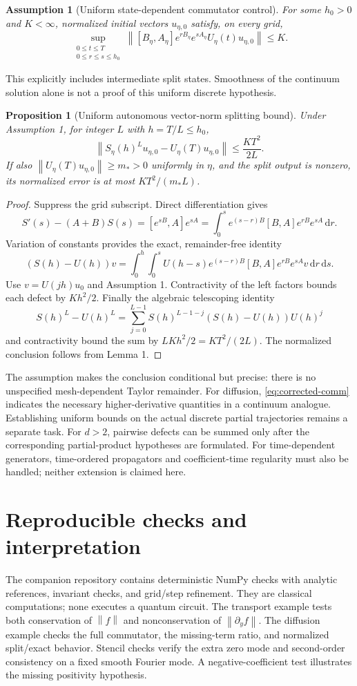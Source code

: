 \documentclass[11pt]{article}
\newtheorem{proposition}{Proposition}
\newtheorem{assumption}{Assumption}
\newcommand{\norm}[1]{\left\lVert #1\right\rVert}
\newcommand{\dd}{\mathrm d}
\begin{document}
\begin{assumption}[Uniform state-dependent commutator control]
For some $h_0>0$ and $K<\infty$, normalized initial vectors $u_{\eta,0}$
satisfy, on every grid,
\[
 \sup_{\substack{0\leq t\leq T\\0\leq r\leq s\leq h_0}}
 \norm{[B_\eta,A_\eta]e^{rB_\eta}e^{sA_\eta}
                  U_\eta(t)u_{\eta,0}}\leq K .
 \label{eq:hyp}
\]
\end{assumption}
This explicitly includes intermediate split states. Smoothness of the
continuum solution alone is not a proof of this uniform discrete
hypothesis.

\begin{proposition}[Uniform autonomous vector-norm splitting bound]
Under Assumption 1, for integer $L$ with $h=T/L\leq h_0$,
\[
 \norm{S_\eta(h)^L u_{\eta,0}-U_\eta(T)u_{\eta,0}}
 \leq \frac{KT^2}{2L}.
 \label{eq:theorem}
\]
If also $\norm{U_\eta(T)u_{\eta,0}}\geq m_*>0$ uniformly in $\eta$,
and the split output is nonzero, its normalized error is at most
$KT^2/(m_*L)$.
\end{proposition}
\begin{proof}
Suppress the grid subscript. Direct differentiation gives
\[
 S'(s)-(A+B)S(s)=[e^{sB},A]e^{sA}
 =\int_0^s e^{(s-r)B}[B,A]e^{rB}e^{sA}\,\dd r.
\]
Variation of constants provides the exact, remainder-free identity
\[
 (S(h)-U(h))v=
 \int_0^h\!\int_0^s
 U(h-s)e^{(s-r)B}[B,A]e^{rB}e^{sA}v\,\dd r\,\dd s .
\]
Use $v=U(jh)u_0$ and Assumption 1. Contractivity of the left factors
bounds each defect by $Kh^2/2$.
Finally the algebraic telescoping identity
\[
 S(h)^L-U(h)^L
 =\sum_{j=0}^{L-1}S(h)^{L-1-j}(S(h)-U(h))U(h)^j
\]
and contractivity bound the sum by $LKh^2/2=KT^2/(2L)$.
The normalized conclusion follows from Lemma 1.
\end{proof}

The assumption makes the conclusion conditional but precise: there is
no unspecified mesh-dependent Taylor remainder. For diffusion,
\eqref{eq:corrected-comm} indicates the necessary higher-derivative
quantities in a continuum analogue. Establishing uniform bounds on
the actual discrete partial trajectories remains a separate task.
For $d>2$, pairwise defects can be summed only after the corresponding
partial-product hypotheses are formulated. For time-dependent
generators, time-ordered propagators and coefficient-time regularity
must also be handled; neither extension is claimed here.

\section{Reproducible checks and interpretation}
The companion repository contains deterministic NumPy checks with
analytic references, invariant checks, and grid/step refinement.
They are classical computations; none executes a quantum circuit.
The transport example tests both conservation of $\norm f$ and
nonconservation of $\norm{\partial_yf}$.
The diffusion example checks the full commutator, the missing-term
ratio, and normalized split/exact behavior. Stencil checks verify
the extra zero mode and second-order consistency on a fixed smooth
Fourier mode. A negative-coefficient test illustrates the missing
positivity hypothesis.
\end{document}
